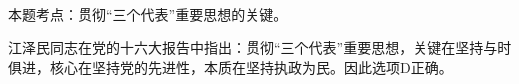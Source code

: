 \\
\par{}
\begin{solution}{{本题考点：贯彻}``三个代表''重要思想的关键。}{}

{{江泽民同志在党的十六大报告中指出：贯彻}``三个代表''重要思想，关键在坚持与时俱进，核心在坚持党的先进性，本质在坚持执政为民。因此选项{D}{正确{。}}}\\
\end{solution}
